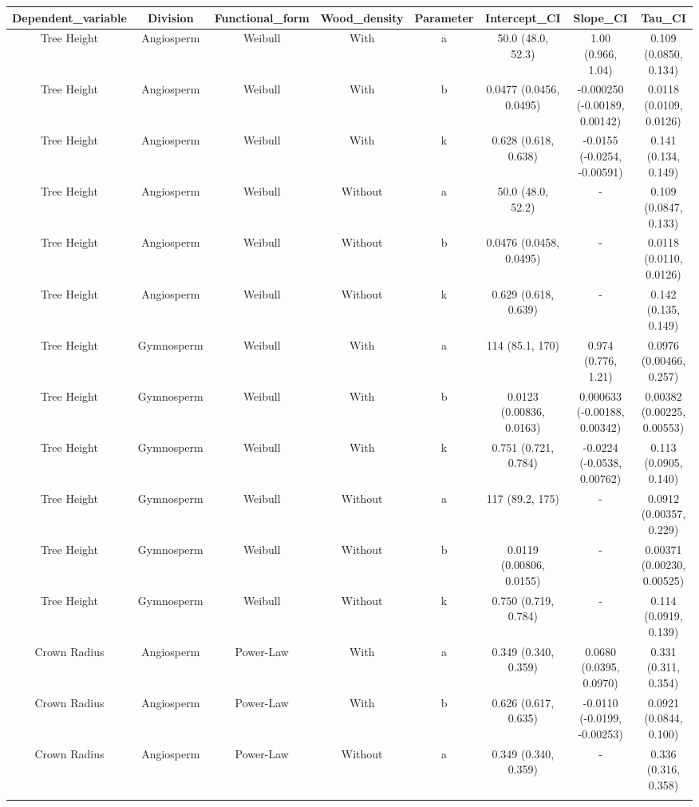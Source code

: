 \documentclass[
  12pt,
  letterpaper,
  DIV=11,
  numbers=noendperiod]{scrartcl}
\begin{document}
\begin{longtable*}[t]{cccccccc}
\toprule
Dependent\_variable & Division & Functional\_form & Wood\_density & Parameter & Intercept\_CI & Slope\_CI & Tau\_CI\\
\midrule
Tree Height & Angiosperm & Weibull & With & a & 50.0 (48.0, 52.3) & 1.00 (0.966, 1.04) & 0.109 (0.0850, 0.134)\\
Tree Height & Angiosperm & Weibull & With & b & 0.0477 (0.0456, 0.0495) & -0.000250 (-0.00189, 0.00142) & 0.0118 (0.0109, 0.0126)\\
Tree Height & Angiosperm & Weibull & With & k & 0.628 (0.618, 0.638) & -0.0155 (-0.0254, -0.00591) & 0.141 (0.134, 0.149)\\
Tree Height & Angiosperm & Weibull & Without & a & 50.0 (48.0, 52.2) & - & 0.109 (0.0847, 0.133)\\
Tree Height & Angiosperm & Weibull & Without & b & 0.0476 (0.0458, 0.0495) & - & 0.0118 (0.0110, 0.0126)\\
\addlinespace
Tree Height & Angiosperm & Weibull & Without & k & 0.629 (0.618, 0.639) & - & 0.142 (0.135, 0.149)\\
Tree Height & Gymnosperm & Weibull & With & a & 114 (85.1, 170) & 0.974 (0.776, 1.21) & 0.0976 (0.00466, 0.257)\\
Tree Height & Gymnosperm & Weibull & With & b & 0.0123 (0.00836, 0.0163) & 0.000633 (-0.00188, 0.00342) & 0.00382 (0.00225, 0.00553)\\
Tree Height & Gymnosperm & Weibull & With & k & 0.751 (0.721, 0.784) & -0.0224 (-0.0538, 0.00762) & 0.113 (0.0905, 0.140)\\
Tree Height & Gymnosperm & Weibull & Without & a & 117 (89.2, 175) & - & 0.0912 (0.00357, 0.229)\\
\addlinespace
Tree Height & Gymnosperm & Weibull & Without & b & 0.0119 (0.00806, 0.0155) & - & 0.00371 (0.00230, 0.00525)\\
Tree Height & Gymnosperm & Weibull & Without & k & 0.750 (0.719, 0.784) & - & 0.114 (0.0919, 0.139)\\
Crown Radius & Angiosperm & Power-Law & With & a & 0.349 (0.340, 0.359) & 0.0680 (0.0395, 0.0970) & 0.331 (0.311, 0.354)\\
Crown Radius & Angiosperm & Power-Law & With & b & 0.626 (0.617, 0.635) & -0.0110 (-0.0199, -0.00253) & 0.0921 (0.0844, 0.100)\\
Crown Radius & Angiosperm & Power-Law & Without & a & 0.349 (0.340, 0.359) & - & 0.336 (0.316, 0.358)\\
\addlinespace

\end{longtable*}
\end{document}

